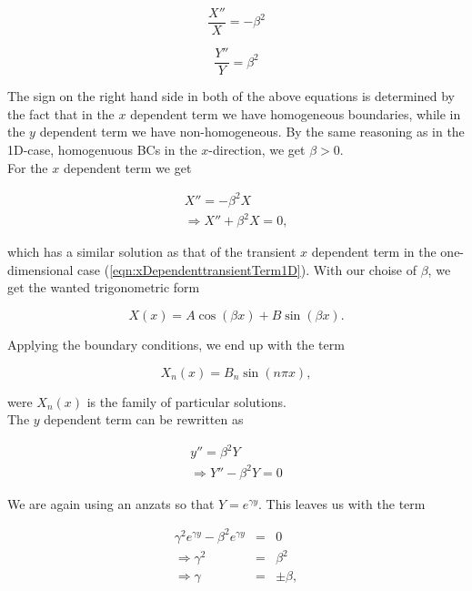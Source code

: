 \documentclass{article}
\begin{document}
\begin{equation}
\frac{X''}{X} = -\beta^2 \nonumber
\end{equation}

\begin{equation}
\frac{Y''}{Y} = \beta^2 \nonumber
\end{equation}

The sign on the right hand side in both of the above equations is determined by the fact that in the $x$ dependent term we have homogeneous boundaries, while in the $y$ dependent term we have non-homogeneous. By the same reasoning as in the 1D-case, homogenuous BCs in the $x$-direction, we get $\beta > 0$. \\

For the $x$ dependent term we get

\begin{eqnarray}
\nonumber
X'' = -\beta^2 X \\ \nonumber
\Rightarrow X'' + \beta^2 X = 0,
\end{eqnarray}

which has a similar solution as that of the transient $x$ dependent term in the one-dimensional case (\ref{eqn:xDependenttransientTerm1D}). With our choise of $\beta$, we get the wanted trigonometric form

\begin{equation}
X(x) = A\cos(\beta x) + B\sin(\beta x) \nonumber.
\end{equation}

Applying the boundary conditions, we end up with the term

\begin{equation}
X_n(x) = B_n\sin(n\pi x),
\label{eqn:xDependenSteadyState2D}
\end{equation}

were ${X_n(x)}$ is the family of particular solutions.\\

The $y$ dependent term can be rewritten as 

\begin{subequations}
	\begin{eqnarray}
	y'' = \beta^2 Y \\ 
	\Rightarrow Y'' - \beta^2 Y = 0 
	\end{eqnarray}
\end{subequations}

We are again using an anzats so that $Y = e^{\gamma y}$. This leaves us with the term

\begin{subequations}
	\begin{eqnarray}
	\gamma^2 e^{\gamma y} - \beta^2 e^{\gamma y} &=& 0 \\ 
	\Rightarrow \gamma^2 &=& \beta^2 \\ 
	\Rightarrow \gamma &=& \pm \beta,
	\end{eqnarray}
\end{subequations}
\end{document}
